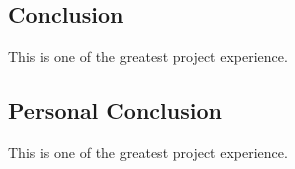 \subsection{Conclusion}
This is one of the greatest project experience.	
\subsection{Personal Conclusion}
This is one of the greatest project experience.	

\lstlistoflistings


{}




